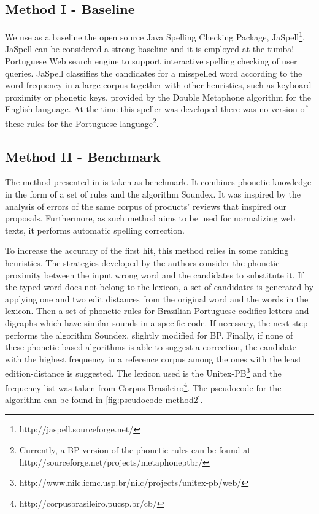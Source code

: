 \subsection{Method I - Baseline}

We use as a baseline the open source Java Spelling Checking Package, JaSpell\footnote {http://jaspell.sourceforge.net/}. JaSpell can be  considered a strong baseline and it is  employed at the tumba! Portuguese Web search engine to support interactive spelling checking of user queries. 
JaSpell classifies the candidates for a misspelled word according to the word frequency in a large corpus together with other heuristics, such as keyboard proximity or phonetic keys, provided by the Double Metaphone algorithm \cite{2000double} for the English language. At the time this speller was developed there was no version of these rules for the Portuguese language\footnote{Currently, a BP version of the phonetic rules can be found at http://sourceforge.net/projects/metaphoneptbr/}. 

\subsection{Method II - Benchmark}

The method presented in \cite{Avanco2014} is taken as benchmark. It combines phonetic knowledge in the form of a set of rules and the algorithm Soundex. It was inspired by the analysis of errors of the same corpus of products' reviews \cite{Hartmann2014} that inspired our proposals. Furthermore, as such method aims to be used for normalizing web texts, it performs automatic spelling correction. 

To increase the accuracy of the first hit, this method relies in some ranking heuristics. The strategies developed by the authors consider the phonetic proximity between the input wrong word and the candidates to substitute it. If the typed word does not belong to the lexicon, a set of candidates is generated by applying one and two edit distances from the original word and the words in the lexicon. Then a set of phonetic rules for Brazilian Portuguese codifies letters and digraphs which have similar sounds in a specific code. If necessary, the next step performs the algorithm Soundex, slightly modified for BP. Finally, if none of these phonetic-based algorithms is able to suggest a correction, the candidate with the highest frequency in a reference corpus among the ones with the least edition-distance is suggested. The lexicon used is the Unitex-PB\footnote{http://www.nilc.icmc.usp.br/nilc/projects/unitex-pb/web/} and the frequency list was taken from Corpus Brasileiro\footnote{http://corpusbrasileiro.pucsp.br/cb/}. The pseudocode for the algorithm can be found in \autoref{fig:pseudocode-method2}.

